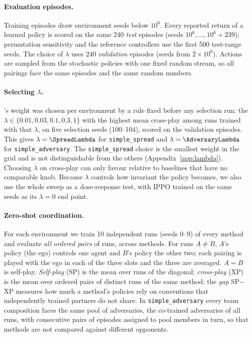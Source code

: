 \paragraph{Evaluation episodes.}
Training episodes draw environment seeds below $10^6$. Every reported return of
a learned policy is scored on the same 240 \emph{test} episodes (seeds
$10^6, \dots, 10^6{+}239$); permutation sensitivity and the reference
controllers use the first 500 test-range seeds. The choice of $\lambda$ uses
240 \emph{validation} episodes (seeds from $2\times10^6$). Actions are sampled
from the stochastic policies with one fixed random stream, so all pairings face
the same episodes and the same random numbers.

\paragraph{Selecting $\lambda$.}
\picr's weight was chosen per environment by a rule fixed before any selection
run: the $\lambda \in \{0.01, 0.03, 0.1, 0.3, 1\}$ with the highest mean
cross-play among runs trained with that $\lambda$, on five selection seeds
(100--104), scored on the validation episodes. This gives $\lambda=\SpreadLambda$
for \texttt{simple\_spread} and $\lambda=\AdversaryLambda$ for
\texttt{simple\_adversary}. The \texttt{simple\_spread} choice is the smallest
weight in the grid and is not distinguishable from the others
(Appendix~\ref{app:lambda}). Choosing $\lambda$ on cross-play can only favour
\picr{} relative to baselines that have no comparable knob. Because $\lambda$
controls how invariant the policy becomes, we also use the whole sweep as a
dose-response test, with IPPO trained on the same seeds as its $\lambda=0$ end
point.

\paragraph{Zero-shot coordination.}
For each environment we train 10 independent runs (seeds 0--9) of every method
and evaluate \emph{all ordered pairs} of runs, across methods. For runs
$A \neq B$, $A$'s policy (the ego) controls one agent and $B$'s policy the other
two; each pairing is played with the ego in each of the three slots and the
three are averaged. $A=B$ is self-play. \emph{Self-play} (SP) is the mean over
runs of the diagonal; \emph{cross-play} (XP) is the mean over ordered pairs of
distinct runs of the same method; the \emph{gap} SP$-$XP measures how much a
method's policies rely on conventions that independently trained partners do
not share. In \texttt{simple\_adversary} every team composition faces the same
pool of adversaries, the co-trained adversaries of all runs, with consecutive
pairs of episodes assigned to pool members in turn, so that methods are not
compared against different opponents.

